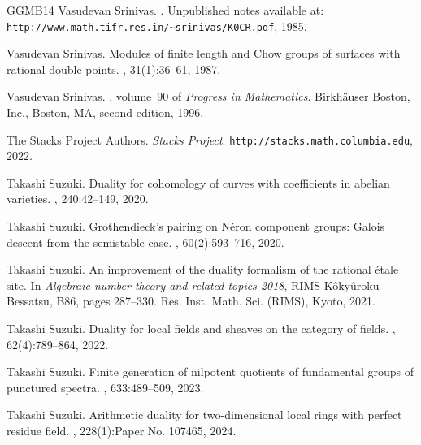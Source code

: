 \documentclass{amsart}
\theoremstyle{remark}
\numberwithin{equation}{section}
\begin{document}
\begin{thebibliography}{GGMB14}
Vasudevan Srinivas.
.
\newblock Unpublished notes available at:
  \texttt{http://www.math.tifr.res.in/\~{}srinivas/K0CR.pdf}, 1985.

Vasudevan Srinivas.
\newblock Modules of finite length and {C}how groups of surfaces with rational
  double points.
, 31(1):36--61, 1987.

Vasudevan Srinivas.
, volume~90 of {\em Progress in
  Mathematics}.
\newblock Birkh\"{a}user Boston, Inc., Boston, MA, second edition, 1996.

The {Stacks Project Authors}.
\newblock \textit{Stacks Project}.
\newblock \verb+http://stacks.math.columbia.edu+, 2022.

Takashi Suzuki.
\newblock Duality for cohomology of curves with coefficients in abelian
  varieties.
, 240:42--149, 2020.

Takashi Suzuki.
\newblock Grothendieck's pairing on {N}\'{e}ron component groups: {G}alois
  descent from the semistable case.
, 60(2):593--716, 2020.

Takashi Suzuki.
\newblock An improvement of the duality formalism of the rational \'{e}tale
  site.
\newblock In {\em Algebraic number theory and related topics 2018}, RIMS
  K\^{o}ky\^{u}roku Bessatsu, B86, pages 287--330. Res. Inst. Math. Sci.
  (RIMS), Kyoto, 2021.

Takashi Suzuki.
\newblock Duality for local fields and sheaves on the category of fields.
, 62(4):789--864, 2022.

Takashi Suzuki.
\newblock Finite generation of nilpotent quotients of fundamental groups of
  punctured spectra.
, 633:489--509, 2023.

Takashi Suzuki.
\newblock Arithmetic duality for two-dimensional local rings with perfect
  residue field.
, 228(1):Paper No. 107465, 2024.

\end{thebibliography}
\end{document}
